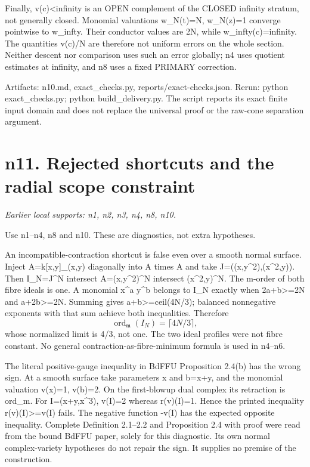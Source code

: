 \documentclass[11pt]{article}
\begin{document}
Finally, v(c)<infinity is an OPEN complement of the CLOSED infinity stratum, not generally closed. Monomial valuations w\_N(t)=N, w\_N(z)=1 converge pointwise to w\_infty. Their conductor values are 2N, while w\_infty(c)=infinity. The quantities v(c)/N are therefore not uniform errors on the whole section. Neither descent nor comparison uses such an error globally; n4 uses quotient estimates at infinity, and n8 uses a fixed PRIMARY correction.

Artifacts: n10.md, exact\_checks.py, reports/exact-checks.json. Rerun: python exact\_checks.py; python build\_delivery.py. The script reports its exact finite input domain and does not replace the universal proof or the raw-cone separation argument.

\section{n11. Rejected shortcuts and the radial scope constraint}
\textit{Earlier local supports: n1, n2, n3, n4, n8, n10.}

Use n1--n4, n8 and n10. These are diagnostics, not extra hypotheses.

An incompatible-contraction shortcut is false even over a smooth normal surface. Inject A=k[x,y]\_(x,y) diagonally into A times A and take J=((x,y\textasciicircum{}2),(x\textasciicircum{}2,y)). Then I\_N=J\textasciicircum{}N intersect A=(x,y\textasciicircum{}2)\textasciicircum{}N intersect (x\textasciicircum{}2,y)\textasciicircum{}N. The m-order of both fibre ideals is one. A monomial x\textasciicircum{}a y\textasciicircum{}b belongs to I\_N exactly when 2a+b>=2N and a+2b>=2N. Summing gives a+b>=ceil(4N/3); balanced nonnegative exponents with that sum achieve both inequalities. Therefore
\[
\operatorname{ord}_{\mathfrak m}(I_N)=\lceil4N/3\rceil,
\]
whose normalized limit is 4/3, not one. The two ideal profiles were not fibre constant. No general contraction-as-fibre-minimum formula is used in n4--n6.

The literal positive-gauge inequality in BdFFU Proposition 2.4(b) has the wrong sign. At a smooth surface take parameters x and b=x+y, and the monomial valuation v(x)=1, v(b)=2. On the first-blowup dual complex its retraction is ord\_m. For I=(x+y,x\textasciicircum{}3), v(I)=2 whereas r(v)(I)=1. Hence the printed inequality r(v)(I)>=v(I) fails. The negative function -v(I) has the expected opposite inequality. Complete Definition 2.1--2.2 and Proposition 2.4 with proof were read from the bound BdFFU paper, solely for this diagnostic. Its own normal complex-variety hypotheses do not repair the sign. It supplies no premise of the construction.
\end{document}

